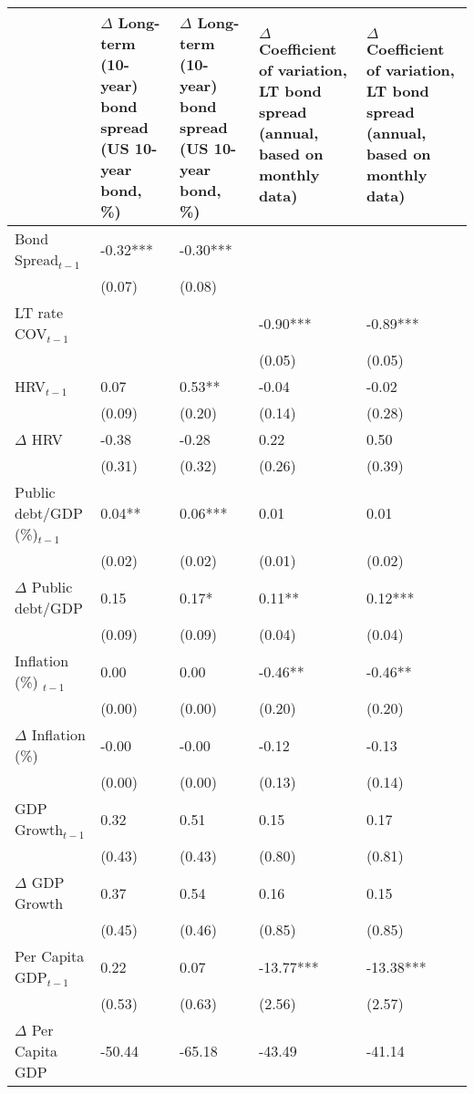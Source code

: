 {\tiny
\begin{tabular}{lp{3cm}p{3cm}p{3cm}p{3cm}}
  \hline
 & $\Delta$ Long-term (10-year) bond spread (US 10-year bond, \%) & $\Delta$ Long-term (10-year) bond spread (US 10-year bond, \%) & $\Delta$ Coefficient of variation, LT bond spread (annual, based on monthly data) & $\Delta$ Coefficient of variation, LT bond spread (annual, based on monthly data) \\ 
  \hline
Bond Spread$_{t-1}$ & -0.32*** & -0.30*** &  &  \\ 
   & (0.07) & (0.08) &  &  \\ 
  LT rate COV$_{t-1}$ &  &  & -0.90*** & -0.89*** \\ 
   &  &  & (0.05) & (0.05) \\ 
  HRV$_{t-1}$ & 0.07 & 0.53** & -0.04 & -0.02 \\ 
   & (0.09) & (0.20) & (0.14) & (0.28) \\ 
  $\Delta$ HRV & -0.38 & -0.28 & 0.22 & 0.50 \\ 
   & (0.31) & (0.32) & (0.26) & (0.39) \\ 
  Public debt/GDP (\%)$_{t-1}$ & 0.04** & 0.06*** & 0.01 & 0.01 \\ 
   & (0.02) & (0.02) & (0.01) & (0.02) \\ 
  $\Delta$ Public debt/GDP & 0.15 & 0.17* & 0.11** & 0.12*** \\ 
   & (0.09) & (0.09) & (0.04) & (0.04) \\ 
  Inflation (\%) $_{t-1}$ & 0.00 & 0.00 & -0.46** & -0.46** \\ 
   & (0.00) & (0.00) & (0.20) & (0.20) \\ 
  $\Delta$ Inflation (\%) & -0.00 & -0.00 & -0.12 & -0.13 \\ 
   & (0.00) & (0.00) & (0.13) & (0.14) \\ 
  GDP Growth$_{t-1}$ & 0.32 & 0.51 & 0.15 & 0.17 \\ 
   & (0.43) & (0.43) & (0.80) & (0.81) \\ 
  $\Delta$ GDP Growth & 0.37 & 0.54 & 0.16 & 0.15 \\ 
   & (0.45) & (0.46) & (0.85) & (0.85) \\ 
  Per Capita GDP$_{t-1}$ & 0.22 & 0.07 & -13.77*** & -13.38*** \\ 
   & (0.53) & (0.63) & (2.56) & (2.57) \\ 
  $\Delta$ Per Capita GDP & -50.44 & -65.18 & -43.49 & -41.14 \\ 

\end{tabular}}
